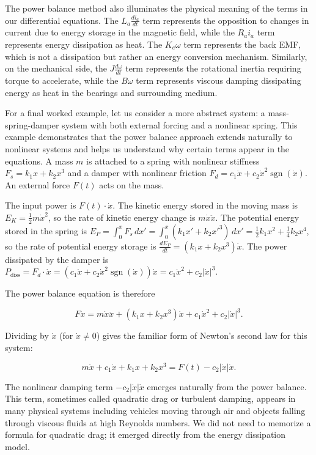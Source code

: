 The power balance method also illuminates the physical meaning of the terms in our differential equations. The $L_a \frac{di_a}{dt}$ term represents the opposition to changes in current due to energy storage in the magnetic field, while the $R_a i_a$ term represents energy dissipation as heat. The $K_e \omega$ term represents the back EMF, which is not a dissipation but rather an energy conversion mechanism. Similarly, on the mechanical side, the $J \frac{d\omega}{dt}$ term represents the rotational inertia requiring torque to accelerate, while the $B\omega$ term represents viscous damping dissipating energy as heat in the bearings and surrounding medium.

For a final worked example, let us consider a more abstract system: a mass-spring-damper system with both external forcing and a nonlinear spring. This example demonstrates that the power balance approach extends naturally to nonlinear systems and helps us understand why certain terms appear in the equations. A mass $m$ is attached to a spring with nonlinear stiffness $F_s = k_1 x + k_2 x^3$ and a damper with nonlinear friction $F_d = c_1 \dot{x} + c_2 \dot{x}^2 \operatorname{sgn}(\dot{x})$. An external force $F(t)$ acts on the mass.

The input power is $F(t) \cdot \dot{x}$. The kinetic energy stored in the moving mass is $E_K = \frac{1}{2}m\dot{x}^2$, so the rate of kinetic energy change is $m\dot{x}\ddot{x}$. The potential energy stored in the spring is $E_P = \int_0^x F_s \, dx' = \int_0^x (k_1 x' + k_2 x'^3) \, dx' = \frac{1}{2}k_1 x^2 + \frac{1}{4}k_2 x^4$, so the rate of potential energy storage is $\frac{dE_P}{dt} = (k_1 x + k_2 x^3) \dot{x}$. The power dissipated by the damper is $P_{\text{diss}} = F_d \cdot \dot{x} = (c_1 \dot{x} + c_2 \dot{x}^2 \operatorname{sgn}(\dot{x})) \dot{x} = c_1 \dot{x}^2 + c_2 |\dot{x}|^3$.

The power balance equation is therefore

\[
F \dot{x} = m\dot{x}\ddot{x} + (k_1 x + k_2 x^3)\dot{x} + c_1 \dot{x}^2 + c_2 |\dot{x}|^3.
\]

Dividing by $\dot{x}$ (for $\dot{x} \neq 0$) gives the familiar form of Newton's second law for this system:

\[
m\ddot{x} + c_1 \dot{x} + k_1 x + k_2 x^3 = F(t) - c_2 |\dot{x}|\dot{x}.
\]

The nonlinear damping term $-c_2 |\dot{x}|\dot{x}$ emerges naturally from the power balance. This term, sometimes called quadratic drag or turbulent damping, appears in many physical systems including vehicles moving through air and objects falling through viscous fluids at high Reynolds numbers. We did not need to memorize a formula for quadratic drag; it emerged directly from the energy dissipation model.

